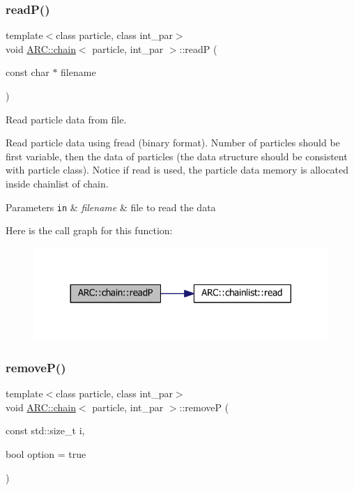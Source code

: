 \subsubsection{\texorpdfstring{read\+P()}{readP()}}
{\footnotesize\ttfamily template$<$class particle, class int\+\_\+par$>$ \\
void \hyperlink{classARC_1_1chain}{A\+R\+C\+::chain}$<$ particle, int\+\_\+par $>$\+::readP (\begin{DoxyParamCaption}\item[{const char $\ast$}]{filename }\end{DoxyParamCaption})\hspace{0.3cm}{\ttfamily [inline]}}



Read particle data from file. 

Read particle data using fread (binary format). Number of particles should be first variable, then the data of particles (the data structure should be consistent with particle class). Notice if read is used, the particle data memory is allocated inside chainlist of chain. 
\begin{DoxyParams}[1]{Parameters}
\mbox{\tt in}  & {\em filename} & file to read the data \\
\hline
\end{DoxyParams}
Here is the call graph for this function\+:
\nopagebreak
\begin{figure}[H]
\begin{center}
\leavevmode
\includegraphics[width=317pt]{classARC_1_1chain_ae14cbd0c85aa090d0848538c6eae0afd_cgraph}
\end{center}
\end{figure}
\hypertarget{classARC_1_1chain_a450a7459b076331b6aaa888d209e888c}{}\label{classARC_1_1chain_a450a7459b076331b6aaa888d209e888c} 
\subsubsection{\texorpdfstring{remove\+P()}{removeP()}}
{\footnotesize\ttfamily template$<$class particle, class int\+\_\+par$>$ \\
void \hyperlink{classARC_1_1chain}{A\+R\+C\+::chain}$<$ particle, int\+\_\+par $>$\+::removeP (\begin{DoxyParamCaption}\item[{const std\+::size\+\_\+t}]{i,  }\item[{bool}]{option = {\ttfamily true} }\end{DoxyParamCaption})\hspace{0.3cm}{\ttfamily [inline]}}



